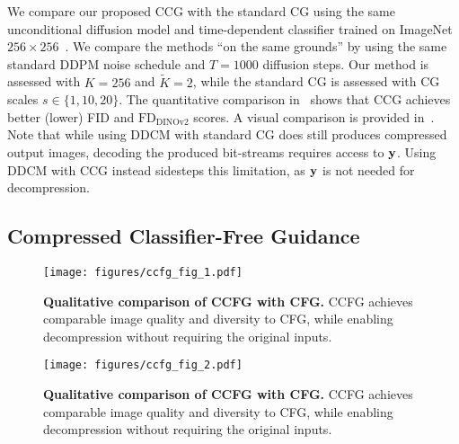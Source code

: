 We compare our proposed CCG with the standard CG using the same unconditional diffusion model and time-dependent classifier trained on ImageNet $256\times256$~\citep{deng2009imagenet,dhariwal2021diffusion}.
We compare the methods ``on the same grounds'' by using the same standard DDPM noise schedule and $T=1000$ diffusion steps.
Our method is assessed with $K=256$ and $\tilde{K}=2$, while the standard CG is assessed with CG scales $s\in\{1,10,20\}$.
The quantitative comparison in~ shows that CCG achieves better (lower) FID and $\text{FD}_{\text{DINOv2}}$ scores.
A visual comparison is provided in~.
Note that while using DDCM with standard CG does still produces compressed output images, decoding the produced bit-streams requires access to ${\mathbf{y}}$.
Using DDCM with CCG instead sidesteps this limitation, as ${\mathbf{y}}$ is not needed for decompression.



\clearpage
\subsection{Compressed Classifier-Free Guidance}\label{appendix:classifier-free-guidance}
\begin{figure*}[t]
    \centering
    \texttt{[image: figures/ccfg\_fig\_1.pdf]}
    \caption{\textbf{Qualitative comparison of CCFG with CFG.} CCFG achieves comparable image quality and diversity to CFG, while enabling decompression without requiring the original inputs.}
    \label{fig:ccfg_visual_1}
\end{figure*}

\begin{figure*}[t]
    \centering
    \texttt{[image: figures/ccfg\_fig\_2.pdf]}
    \caption{\textbf{Qualitative comparison of CCFG with CFG.} CCFG achieves comparable image quality and diversity to CFG, while enabling decompression without requiring the original inputs.}
    \label{fig:ccfg_visual_2}
\end{figure*}

